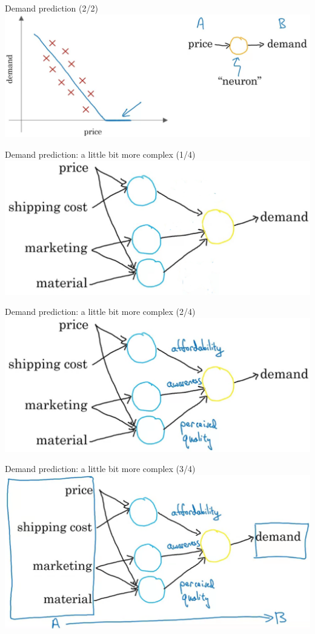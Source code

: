 \documentclass[pdf]{beamer}
\theoremstyle{mystyle}
\begin{document}
\begin{frame}{Demand prediction (2/2)}
	\centering
	\includegraphics[scale=.225]{demand-prediction-line}
\end{frame}

\begin{frame}{Demand prediction: a little bit more complex (1/4)}
	\centering
	\includegraphics[scale=.275]{demand-prediction-nn-0.png}
\end{frame}

\begin{frame}{Demand prediction: a little bit more complex (2/4)}
	\centering
	\includegraphics[scale=.275]{demand-prediction-nn.png}
\end{frame}

\begin{frame}{Demand prediction: a little bit more complex (3/4)}
	\centering
	\includegraphics[scale=.275]{demand-prediction-nn-2.png}
\end{frame}
\end{document}
